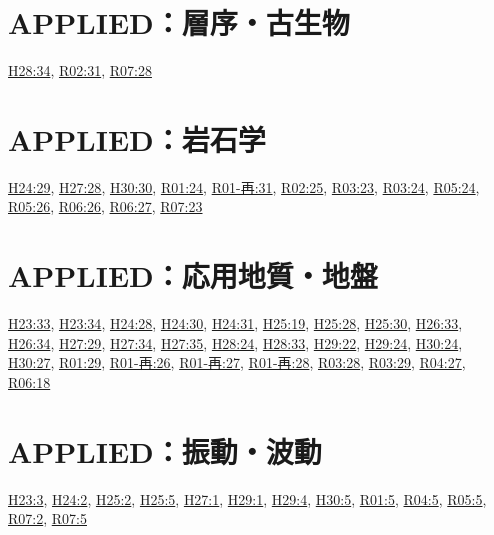 \section{APPLIED：層序・古生物}
\hyperref[q:h28-reg-applied-34]{H28:34}, \hyperref[q:r02-reg-applied-31]{R02:31}, \hyperref[q:r07-reg-applied-28]{R07:28}
\section{APPLIED：岩石学}
\hyperref[q:h24-reg-applied-29]{H24:29}, \hyperref[q:h27-reg-applied-28]{H27:28}, \hyperref[q:h30-reg-applied-30]{H30:30}, \hyperref[q:r01-reg-applied-24]{R01:24}, \hyperref[q:r01-ret-applied-31]{R01-再:31}, \hyperref[q:r02-reg-applied-25]{R02:25}, \hyperref[q:r03-reg-applied-23]{R03:23}, \hyperref[q:r03-reg-applied-24]{R03:24}, \hyperref[q:r05-reg-applied-24]{R05:24}, \hyperref[q:r05-reg-applied-26]{R05:26}, \hyperref[q:r06-reg-applied-26]{R06:26}, \hyperref[q:r06-reg-applied-27]{R06:27}, \hyperref[q:r07-reg-applied-23]{R07:23}
\section{APPLIED：応用地質・地盤}
\hyperref[q:h23-reg-applied-33]{H23:33}, \hyperref[q:h23-reg-applied-34]{H23:34}, \hyperref[q:h24-reg-applied-28]{H24:28}, \hyperref[q:h24-reg-applied-30]{H24:30}, \hyperref[q:h24-reg-applied-31]{H24:31}, \hyperref[q:h25-reg-applied-19]{H25:19}, \hyperref[q:h25-reg-applied-28]{H25:28}, \hyperref[q:h25-reg-applied-30]{H25:30}, \hyperref[q:h26-reg-applied-33]{H26:33}, \hyperref[q:h26-reg-applied-34]{H26:34}, \hyperref[q:h27-reg-applied-29]{H27:29}, \hyperref[q:h27-reg-applied-34]{H27:34}, \hyperref[q:h27-reg-applied-35]{H27:35}, \hyperref[q:h28-reg-applied-24]{H28:24}, \hyperref[q:h28-reg-applied-33]{H28:33}, \hyperref[q:h29-reg-applied-22]{H29:22}, \hyperref[q:h29-reg-applied-24]{H29:24}, \hyperref[q:h30-reg-applied-24]{H30:24}, \hyperref[q:h30-reg-applied-27]{H30:27}, \hyperref[q:r01-reg-applied-29]{R01:29}, \hyperref[q:r01-ret-applied-26]{R01-再:26}, \hyperref[q:r01-ret-applied-27]{R01-再:27}, \hyperref[q:r01-ret-applied-28]{R01-再:28}, \hyperref[q:r03-reg-applied-28]{R03:28}, \hyperref[q:r03-reg-applied-29]{R03:29}, \hyperref[q:r04-reg-applied-27]{R04:27}, \hyperref[q:r06-reg-applied-18]{R06:18}
\section{APPLIED：振動・波動}
\hyperref[q:h23-reg-applied-03]{H23:3}, \hyperref[q:h24-reg-applied-02]{H24:2}, \hyperref[q:h25-reg-applied-02]{H25:2}, \hyperref[q:h25-reg-applied-05]{H25:5}, \hyperref[q:h27-reg-applied-01]{H27:1}, \hyperref[q:h29-reg-applied-01]{H29:1}, \hyperref[q:h29-reg-applied-04]{H29:4}, \hyperref[q:h30-reg-applied-05]{H30:5}, \hyperref[q:r01-reg-applied-05]{R01:5}, \hyperref[q:r04-reg-applied-05]{R04:5}, \hyperref[q:r05-reg-applied-05]{R05:5}, \hyperref[q:r07-reg-applied-02]{R07:2}, \hyperref[q:r07-reg-applied-05]{R07:5}
